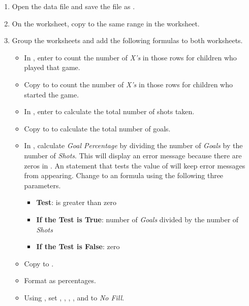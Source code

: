 \begin{enumerate}
	\item Open the data file  and save the file as .
	\item On the  worksheet, copy  to the same range in the  worksheet.
	\item Group the worksheets and add the following formulas to both worksheets.

	\begin{itemize}
		\item In , enter  to count the number of \textit{X's} in those rows for children who played that game.
		\item Copy  to  to count the number of \textit{X's} in those rows for children who started the game.
		\item In , enter  to calculate the total number of shots taken. 
		\item Copy  to  to calculate the total number of goals.
		\item In , calculate \textit{Goal Percentage} by dividing the number of \textit{Goals} by the number of \textit{Shots}. This will display an error message because there are zeros in . An  statement that tests the value of  will keep error messages from appearing. Change  to an  formula using the following three parameters.
		\begin{itemize}
			\item \textbf{Test}: is  greater than zero
			\item \textbf{If the Test is True}: number of \textit{Goals} divided by the number of \textit{Shots}
			\item \textbf{If the Test is False}: zero
		\end{itemize}
		\item Copy  to .
		\item Format  as percentages.
		\item Using , set , , , , and  to \textit{No Fill}. 
		\end{itemize}	
	

\end{enumerate}
